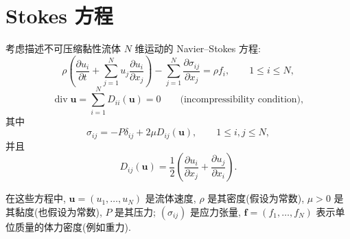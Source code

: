 \section{Stokes 方程}\label{sec:stokes-equations}

考虑描述不可压缩黏性流体 $N$ 维运动的 Navier--Stokes 方程:
\begin{equation}\label{eq:stokes-navier-momentum-components}
\rho\left(
\frac{\partial u_i}{\partial t}
+\sum_{j=1}^{N}u_j\frac{\partial u_i}{\partial x_j}
\right)
-\sum_{j=1}^{N}\frac{\partial\sigma_{ij}}{\partial x_j}
=\rho f_i,
\qquad 1\le i\le N,
\end{equation}
\begin{equation}\label{eq:stokes-incompressibility-strain}
\operatorname{div}\mathbf{u}
=\sum_{i=1}^{N}D_{ii}(\mathbf{u})=0
\qquad\text{(incompressibility condition)},
\end{equation}
其中
\begin{equation}\label{eq:stokes-stress-tensor}
\sigma_{ij}=-P\delta_{ij}+2\mu D_{ij}(\mathbf{u}),
\qquad 1\le i,j\le N,
\end{equation}
并且
\[
D_{ij}(\mathbf{u})
=\frac12\left(
\frac{\partial u_i}{\partial x_j}
+\frac{\partial u_j}{\partial x_i}
\right).
\]

在这些方程中, $\mathbf{u}=(u_1,\ldots,u_N)$ 是流体速度,
$\rho$ 是其密度(假设为常数), $\mu>0$ 是其黏度(也假设为常数),
$P$ 是其压力; $(\sigma_{ij})$ 是应力张量,
$\mathbf{f}=(f_1,\ldots,f_N)$ 表示单位质量的体力密度(例如重力).

